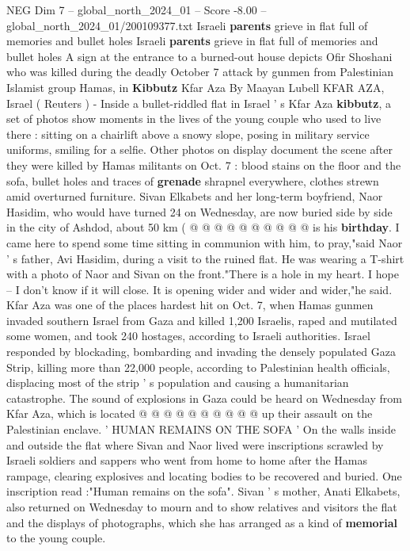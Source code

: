 \begin{textsample}{NEG Dim 7 – global\_north\_2024\_01 – Score -8.00 – global\_north\_2024\_01/200109377.txt}  \label{ex:f7_neg_207}
Israeli \textbf{parents} grieve in flat full of memories and bullet holes Israeli \textbf{parents} grieve in flat full of memories and bullet holes A sign at the entrance to a burned-out house depicts Ofir Shoshani who was killed during the deadly October 7 attack by gunmen from Palestinian Islamist group Hamas, in \textbf{Kibbutz} Kfar Aza By Maayan Lubell KFAR AZA, Israel ( Reuters ) - Inside a bullet-riddled flat in Israel ' s Kfar Aza \textbf{kibbutz}, a set of photos show moments in the lives of the young couple who used to live there : sitting on a chairlift above a snowy slope, posing in military service uniforms, smiling for a selfie.
Other photos on display document the scene after they were killed by Hamas militants on Oct. 7 : blood stains on the floor and the sofa, bullet holes and traces of \textbf{grenade} shrapnel everywhere, clothes strewn amid overturned furniture.
Sivan Elkabets and her long-term boyfriend, Naor Hasidim, who would have turned 24 on Wednesday, are now buried side by side in the city of Ashdod, about 50 km ( @ @ @ @ @ @ @ @ @ @ is his \textbf{birthday}.
I came here to spend some time sitting in communion with him, to pray,"said Naor ' s father, Avi Hasidim, during a visit to the ruined flat.
He was wearing a T-shirt with a photo of Naor and Sivan on the front."There is a hole in my heart.
I hope -- I don't know if it will close.
It is opening wider and wider and wider,"he said.
Kfar Aza was one of the places hardest hit on Oct. 7, when Hamas gunmen invaded southern Israel from Gaza and killed 1,200 Israelis, raped and mutilated some women, and took 240 hostages, according to Israeli authorities.
Israel responded by blockading, bombarding and invading the densely populated Gaza Strip, killing more than 22,000 people, according to Palestinian health officials, displacing most of the strip ' s population and causing a humanitarian catastrophe.
The sound of explosions in Gaza could be heard on Wednesday from Kfar Aza, which is located @ @ @ @ @ @ @ @ @ @ up their assault on the Palestinian enclave. ' HUMAN REMAINS ON THE SOFA ' On the walls inside and outside the flat where Sivan and Naor lived were inscriptions scrawled by Israeli soldiers and sappers who went from home to home after the Hamas rampage, clearing explosives and locating bodies to be recovered and buried.
One inscription read :"Human remains on the sofa".
Sivan ' s mother, Anati Elkabets, also returned on Wednesday to mourn and to show relatives and visitors the flat and the displays of photographs, which she has arranged as a kind of \textbf{memorial} to the young couple.

\end{textsample}
